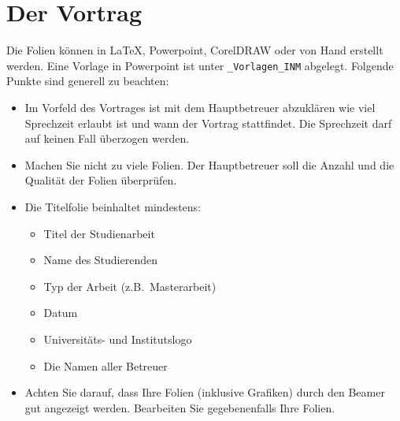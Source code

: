 \section{Der Vortrag}\label{sec:Vortrag}
Die Folien können in \LaTeX, Powerpoint, CorelDRAW oder von
Hand erstellt werden. Eine Vorlage in Powerpoint ist unter \verb"_Vorlagen_INM" abgelegt. Folgende Punkte sind generell zu beachten:
\begin{itemize}
 \item Im Vorfeld des Vortrages ist mit dem Hauptbetreuer abzuklären wie viel Sprechzeit erlaubt ist und wann der Vortrag stattfindet. Die Sprechzeit darf auf keinen Fall überzogen werden.

 \item Machen Sie nicht zu viele Folien. Der Hauptbetreuer soll die Anzahl und die Qualität der Folien überprüfen.

 \item Die Titelfolie beinhaltet mindestens:
  \begin{itemize}
   \item Titel der Studienarbeit
   \item Name des Studierenden
   \item Typ der Arbeit (z.B.~Masterarbeit)
   \item Datum
   \item Universitäts- und Institutslogo
   \item Die Namen aller Betreuer
  \end{itemize}

  \item Achten Sie darauf, dass Ihre Folien (inklusive Grafiken) durch den Beamer gut angezeigt werden. Bearbeiten Sie gegebenenfalls Ihre Folien.
\end{itemize}
